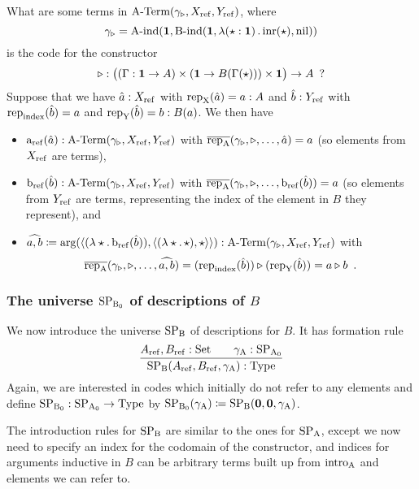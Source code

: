 \documentclass{article}
\begin{document}
\begin{example}
  What are some terms in $\text{A-Term}(\gamma_{\triangleright}, X_{\mathrm{ref}}, Y_{\mathrm{ref}})$, where
  \[
  \gamma_{\triangleright} = \text{A-ind}(\mathbf{1}, \text{B-ind}(\mathbf{1},
  \lambda (\star : \mathbf{1})\,.\,\text{inr}(\star), \text{nil}))
  \]
  is the code for the constructor
  \[
  \triangleright : \big((\Gamma : \mathbf{1} \to A) \times (\mathbf{1} \to B(\Gamma(\star))) \times \mathbf{1}\big) \to A \enspace ?
  \]
  Suppose that we have $\hat{a} : X_{\mathrm{ref}}$ with $\text{rep}_{\mathrm{X}}(\hat{a}) = a : A$
  and $\hat{b} : Y_{\mathrm{ref}}$ with $\text{rep}_{\mathrm{index}}(\hat{b}) = a$ and
  $\text{rep}_{\mathrm{Y}}(\hat{b}) = b : B(a)$. We then have 
  \begin{itemize}
  \item $\text{a}_{\mathrm{ref}}(\hat{a}) : \text{A-Term}(\gamma_{\triangleright}, X_{\mathrm{ref}}, Y_{\mathrm{ref}})$ with
  $\overline{\text{rep}_{\mathrm{A}}}(\gamma_{\triangleright}, \triangleright, \ldots, \hat{a}) =
  a$ (so elements from $X_{\mathrm{ref}}$ are terms),
\item $\text{b}_{\mathrm{ref}}(\hat{b}) :  \text{A-Term}(\gamma_{\triangleright}, X_{\mathrm{ref}}, Y_{\mathrm{ref}})$ with
  $\overline{\text{rep}_{\mathrm{A}}}(\gamma_{\triangleright}, \triangleright, \ldots,
  \text{b}_{\mathrm{ref}}(\hat{b})) = a$ (so elements from $Y_{\mathrm{ref}}$ are terms,
  representing the index of the element in $B$ they represent), and
\item  $\widehat{a,b} \coloneqq \text{arg}(\langle (\lambda \star.\,\text{b}_{\mathrm{ref}}(\hat{b})) ,
  \langle (\lambda \star.\,\star), \star\rangle\rangle) :
  \text{A-Term}(\gamma_{\triangleright}, X_{\mathrm{ref}}, Y_{\mathrm{ref}})$ with
  \[
      \overline{\text{rep}_{\mathrm{A}}}(\gamma_{\triangleright}, \triangleright, \ldots, \widehat{a,b})
    = (\text{rep}_{\mathrm{index}}(\hat{b})) \triangleright (\text{rep}_{\mathrm{Y}}(\hat{b})) 
    = a \triangleright b \enspace .
  \]
\end{itemize}
%
 \blackqed
\end{example}

\subsubsection{The universe $\text{SP}_{\mathrm{B}_0}$ of descriptions of $B$}
\label{sec:SPB}

We now introduce the universe $\text{SP}_{\mathrm{B}}$ of descriptions
for $B$. It has formation rule
%
\[
\infer{\SPB(\Aref, \Bref, \gammaA) : \TYPE}{\Aref, \Bref : \Set & \quad \gammaA : \SPAp}
\]
%
Again, we are interested in codes which initially do not refer to
any elements and define $\text{SP}_{\mathrm{B}_0} : \text{SP}_{\mathrm{A}_0} \to \text{Type}$ by $\text{SP}_{\mathrm{B}_0}(\gamma_{\mathrm{A}})
\coloneqq \text{SP}_{\mathrm{B}}(\mathbf{0}, \mathbf{0}, \gamma_{\mathrm{A}})$.

The introduction rules for $\text{SP}_{\mathrm{B}}$ are similar to the ones for $\text{SP}_{\mathrm{A}}$,
except we now need to specify an index for the codomain of the
constructor, and indices for arguments inductive in $B$ can be
arbitrary terms built up from $\text{intro}_{\mathrm{A}}$ and elements we can refer to.
\end{document}
